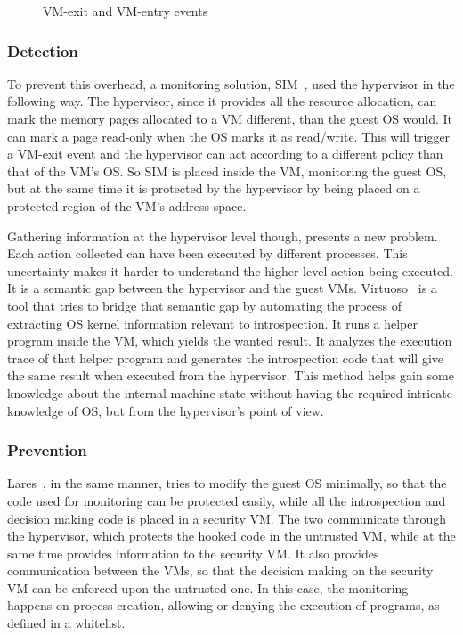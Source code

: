 \begin{figure}[ht]
	\centering
	
	\caption{VM-exit and VM-entry events}
	\label{fig:vmevents}
\end{figure}

\subsubsection{Detection}

To prevent this overhead, a monitoring solution, SIM~\cite{sharif2009secure}, used the hypervisor in the following way. The hypervisor, since it provides all the resource allocation, can mark the memory pages allocated to a \ac{VM} different, than the guest \ac{OS} would. It can mark a page read-only when the \ac{OS} marks it as read/write. This will trigger a \ac{VM}-exit event and the hypervisor can act according to a different policy than that of the \ac{VM}’s \ac{OS}. So SIM is placed inside the \ac{VM}, monitoring the guest \ac{OS}, but at the same time it is protected by the hypervisor by being placed on a protected region of the \ac{VM}’s address space. 

\par Gathering information at the hypervisor level though, presents a new problem. Each action collected can have been executed by different processes. This uncertainty makes it harder to understand the higher level action being executed. It is a semantic gap between the hypervisor and the guest \ac{VM}s. Virtuoso~\cite{dolan2011virtuoso} is a tool that tries to bridge that semantic gap by automating the process of extracting \ac{OS} kernel information relevant to introspection. It runs a helper program inside the \ac{VM}, which yields the wanted result. It analyzes the execution trace of that helper program and generates the introspection code that will give the same result when executed from the hypervisor. This method helps gain some knowledge about the internal machine state without having the required intricate knowledge of \ac{OS}, but from the hypervisor’s point of view. 

\subsubsection{Prevention}

Lares~\cite{payne2008lares}, in the same manner, tries to modify the guest \ac{OS} minimally, so that the code used for monitoring can be protected easily, while all the introspection and decision making code is placed in a security \ac{VM}. The two communicate through the hypervisor, which protects the hooked code in the untrusted \ac{VM}, while at the same time provides information to the security \ac{VM}. It also provides communication between the \ac{VM}s, so that the decision making on the security \ac{VM} can be enforced upon the untrusted one. In this case, the monitoring happens on process creation, allowing or denying the execution of programs, as defined in a whitelist.

